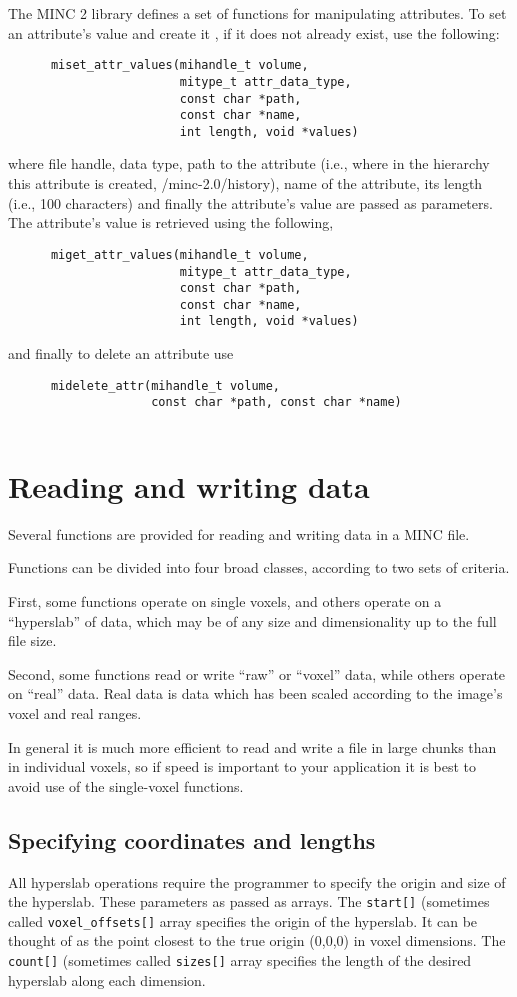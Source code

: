 \documentclass{article}
\begin{document}
The MINC 2 library defines a set of functions for manipulating attributes. To set an attribute's value and
create it , if it does not already exist, use the following:
\begin{verbatim}
      miset_attr_values(mihandle_t volume, 
                        mitype_t attr_data_type,
                        const char *path, 
                        const char *name,
                        int length, void *values)
\end{verbatim}
where file handle, data type, path to the attribute (i.e., where in the hierarchy this
attribute is created, /minc-2.0/history), name of the attribute, its length (i.e., 100 
characters) and finally the attribute's value are passed as parameters. 
The attribute's value is retrieved using the following,
\begin{verbatim}
      miget_attr_values(mihandle_t volume,
                        mitype_t attr_data_type,
                        const char *path, 
                        const char *name,
                        int length, void *values)
\end{verbatim}
and finally to delete an attribute use
\begin{verbatim}
      midelete_attr(mihandle_t volume, 
                    const char *path, const char *name)
                       
\end{verbatim}
\section{Reading and writing data}
Several functions are provided for reading and writing data in a MINC 
file.

Functions can be divided into four broad classes, according to two 
sets of criteria.

First, some functions operate on single voxels, and others operate on
a ``hyperslab'' of data, which may be of any size and dimensionality up to the 
full file size.

Second, some functions read or write ``raw'' or ``voxel'' data, while others
operate on ``real'' data.  Real data is data which has been scaled according
to the image's voxel and real ranges.

In general it is much more efficient to read and write a file in large
chunks than in individual voxels, so if speed is important to your
application it is best to avoid use of the single-voxel functions.

\subsection{Specifying coordinates and lengths}
All hyperslab operations require the programmer to specify the origin
and size of the hyperslab.  These parameters as passed as arrays.  The
{\tt start[]} (sometimes called {\tt voxel\_offsets[]} array
specifies the origin of the hyperslab.  It can be thought of as the
point closest to the true origin (0,0,0) in voxel dimensions.  The
{\tt count[]} (sometimes called {\tt sizes[]} array specifies the length
of the desired hyperslab along each dimension.
\end{document}
